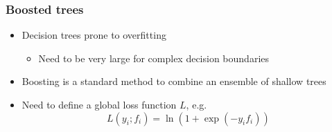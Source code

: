 \documentclass[aspectratio=169,xcolor=dvipsnames,,table,compress]{beamer}
\begin{document}
\begin{frame}[t]
\begin{columns}[T]
\begin{column}{0.33\textwidth}
    \end{column}
  \end{columns}
\end{frame}

\begin{frame}[t] \frametitle{Boosted trees}
  \vspace{-5mm}
  \begin{itemize}
    \item Decision trees prone to overfitting
    \begin{itemize}
      \item Need to be very large for complex decision boundaries
    \end{itemize}
    \item Boosting is a standard method to combine an ensemble of shallow trees
    \item Need to define a global loss function $L$, e.g.
    \[L(y_i; f_i) = \ln\left(1 + \exp(-y_if_i)\right)\]
  \end{itemize}
\end{frame}
\end{document}
